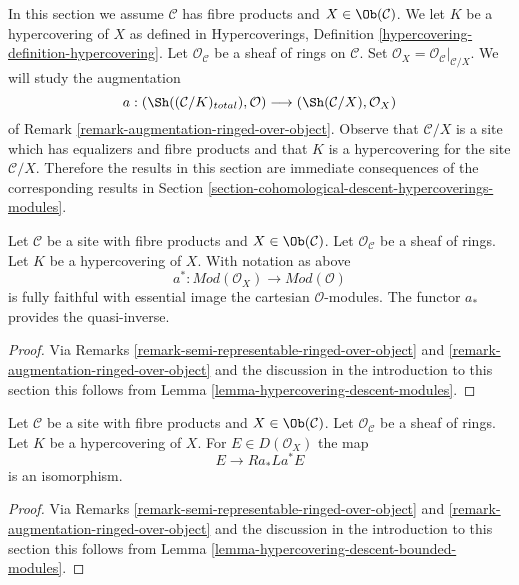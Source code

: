 \noindent
In this section we assume $\mathcal{C}$ has fibre products
and $X \in \Ob(\mathcal{C})$. We let $K$ be a hypercovering of $X$
as defined in
Hypercoverings, Definition \ref{hypercovering-definition-hypercovering}.
Let $\mathcal{O}_\mathcal{C}$ be a sheaf of rings on $\mathcal{C}$.
Set $\mathcal{O}_X = \mathcal{O}_\mathcal{C}|_{\mathcal{C}/X}$.
We will study the augmentation
$$
a :
(\Sh((\mathcal{C}/K)_{total}), \mathcal{O})
\longrightarrow
(\Sh(\mathcal{C}/X), \mathcal{O}_X)
$$
of Remark \ref{remark-augmentation-ringed-over-object}.
Observe that $\mathcal{C}/X$ is a site which has equalizers
and fibre products and that $K$ is a
hypercovering for the site $\mathcal{C}/X$.
Therefore the results in this section are immediate consequences
of the corresponding results in
Section \ref{section-cohomological-descent-hypercoverings-modules}.

\begin{lemma}
\label{lemma-hypercovering-X-descent-modules}
Let $\mathcal{C}$ be a site with fibre products and $X \in \Ob(\mathcal{C})$.
Let $\mathcal{O}_\mathcal{C}$ be a sheaf of rings.
Let $K$ be a hypercovering of $X$. With notation as above
$$
a^* : \textit{Mod}(\mathcal{O}_X) \to \textit{Mod}(\mathcal{O})
$$
is fully faithful with essential image the cartesian $\mathcal{O}$-modules.
The functor $a_*$ provides the quasi-inverse.
\end{lemma}

\begin{proof}
Via Remarks \ref{remark-semi-representable-ringed-over-object} and
\ref{remark-augmentation-ringed-over-object} and the discussion in
the introduction to this section
this follows from Lemma \ref{lemma-hypercovering-descent-modules}.
\end{proof}

\begin{lemma}
\label{lemma-hypercovering-X-descent-bounded-modules}
Let $\mathcal{C}$ be a site with fibre products and $X \in \Ob(\mathcal{C})$.
Let $\mathcal{O}_\mathcal{C}$ be a sheaf of rings.
Let $K$ be a hypercovering of $X$. For
$E \in D(\mathcal{O}_X)$ the map
$$
E \longrightarrow Ra_*La^*E
$$
is an isomorphism.
\end{lemma}

\begin{proof}
Via Remarks \ref{remark-semi-representable-ringed-over-object} and
\ref{remark-augmentation-ringed-over-object} and the discussion in
the introduction to this section
this follows from Lemma \ref{lemma-hypercovering-descent-bounded-modules}.
\end{proof}

